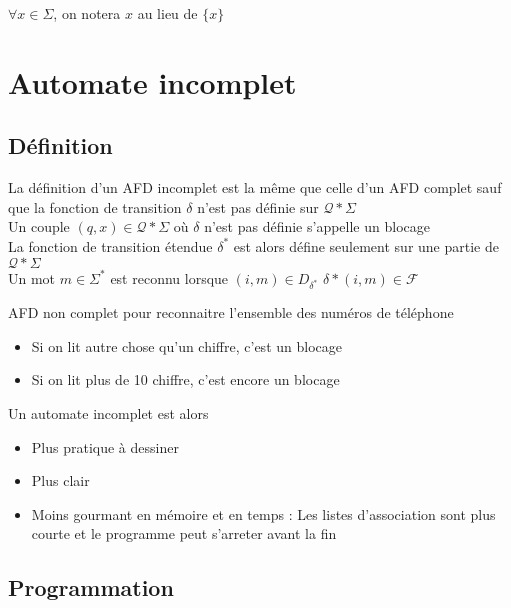 \begin{rmq}
$\forall x \in \Sigma$, on notera $x$ au lieu de $\{x\}$
\end{rmq}

\section{Automate incomplet}

\subsection{Définition}

La définition d'un AFD incomplet est la même que celle d'un AFD complet sauf que la fonction de transition
$\delta$ n'est pas définie sur $\mathcal{Q}*\Sigma$ \\

Un couple $(q,x) \in \mathcal{Q}*\Sigma$ où $\delta$ n'est pas définie s'appelle un blocage\\

La fonction de transition étendue $\delta^*$  est alors défine seulement sur une partie de $\mathcal{Q}*\Sigma$\\
Un mot $m\in \Sigma^*$ est reconnu lorsque
\beginmatrix
$(i,m)\in D_{\delta^*}$
$\delta*(i,m)\in \mathcal{F}$

\begin{exemple}
    AFD non complet pour reconnaitre l'ensemble des numéros de téléphone 
    \begin{itemize}
        \item Si on lit autre chose qu'un chiffre, c'est un blocage
        \item Si on lit plus de 10 chiffre, c'est encore un blocage
    \end{itemize}
\end{exemple}

Un automate incomplet est alors
\begin{itemize}
    \item Plus pratique à dessiner
    \item Plus clair
    \item Moins gourmant en mémoire et en temps : Les listes d'association sont plus courte et le programme peut s'arreter avant la fin
\end{itemize}

\subsection{Programmation}

